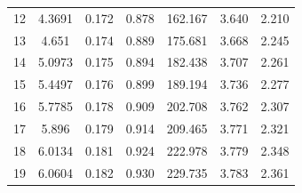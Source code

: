 \documentclass[%
 aip,
 amsmath,amssymb,
 reprint,%
]{revtex4-1}
\begin{document}
\begin{table}[]
\begin{tabular}{@{}ccccccc@{}}
12 & 4.3691 & 0.172 & 0.878 & 162.167 & 3.640 & 2.210 \\
13 & 4.651  & 0.174 & 0.889 & 175.681 & 3.668 & 2.245 \\
14 & 5.0973 & 0.175 & 0.894 & 182.438 & 3.707 & 2.261 \\
15 & 5.4497 & 0.176 & 0.899 & 189.194 & 3.736 & 2.277 \\
16 & 5.7785 & 0.178 & 0.909 & 202.708 & 3.762 & 2.307 \\
17 & 5.896  & 0.179 & 0.914 & 209.465 & 3.771 & 2.321 \\
18 & 6.0134 & 0.181 & 0.924 & 222.978 & 3.779 & 2.348 \\
19 & 6.0604 & 0.182 & 0.930 & 229.735 & 3.783 & 2.361 \\ \bottomrule
\end{tabular}
\end{table}
\end{document}

